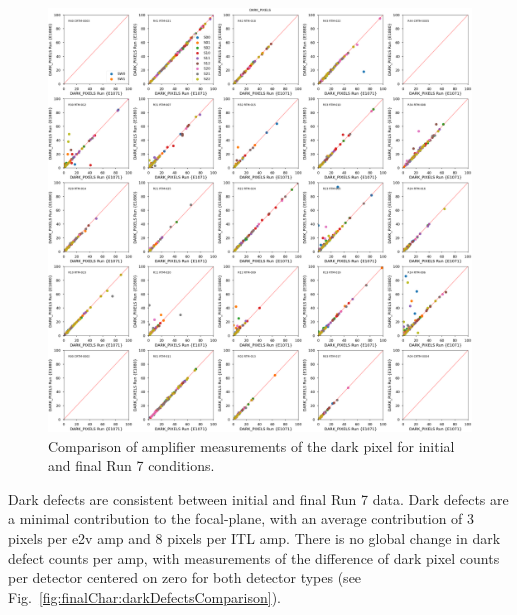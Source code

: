 \begin{figure}[ht]
    \centering
    \includegraphics[width=0.7\linewidth]{figures/finalCharacterization/E1880_E1071_DARK_PIXELS_inset.png}
    \caption{Comparison of amplifier measurements of the dark pixel for initial and final Run 7 conditions.}
    \label{fig:finalChar-DarkPix-5x5}
\end{figure}

Dark defects are consistent between initial and final Run 7 data. Dark defects are a minimal contribution to the focal-plane, with an average contribution of 3 pixels per e2v amp and 8 pixels per ITL amp. There is no global change in dark defect counts per amp, with measurements of the difference of 
dark pixel counts per detector centered on zero for both detector types (see Fig.~\ref{fig:finalChar:darkDefectsComparison}). 

